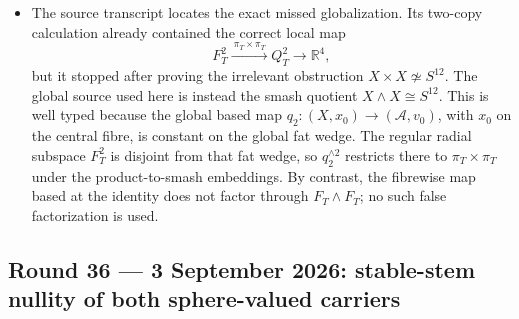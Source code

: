 \begin{itemize}[leftmargin=1.8em]
\item The source transcript locates the exact missed globalization.  Its
two-copy calculation already contained the correct local map
\[
 F_T^2\xrightarrow{\ \pi_T\times\pi_T\ }Q_T^2
 \longrightarrow\mathbb R^4,
\]
but it stopped after proving the irrelevant obstruction
\(X\times X\not\simeq S^{12}\).  The global source used here is instead the
smash quotient \(X\wedge X\cong S^{12}\).  This is well typed because the
global based map \(q_2:(X,x_0)\to(\mathcal A,v_0)\), with \(x_0\) on the
central fibre, is constant on the global fat wedge.  The regular radial
subspace \(F_T^2\) is disjoint from that fat wedge, so
\(q_2^{\wedge2}\) restricts there to \(\pi_T\times\pi_T\) under the
product-to-smash embeddings.  By contrast, the fibrewise map based at the
identity does not factor through \(F_T\wedge F_T\); no such false
factorization is used.
\end{itemize}

\subsection*{Round 36 --- 3 September 2026: stable-stem nullity of both
sphere-valued carriers}

